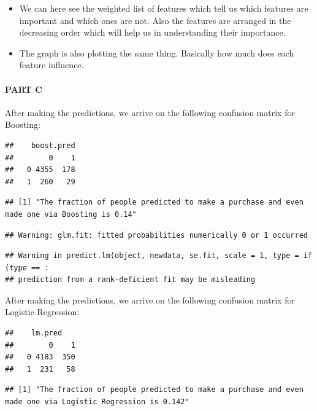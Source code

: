 \documentclass[
]{article}
\providecommand{\tightlist}{%
  \setlength{\itemsep}{0pt}\setlength{\parskip}{0pt}}
\begin{document}
\begin{itemize}
\tightlist
\item
  We can here see the weighted list of features which tell us which
  features are important and which ones are not. Also the features are
  arranged in the decreasing order which will help us in understanding
  their importance.
\item
  The graph is also plotting the same thing. Basically how much does
  each feature influence.
\end{itemize}

\hypertarget{part-c-5}{%
\paragraph{\texorpdfstring{{PART C}}{PART C}}\label{part-c-5}}

After making the predictions, we arrive on the following confusion
matrix for Boosting:

\begin{verbatim}
##    boost.pred
##        0    1
##   0 4355  178
##   1  260   29
\end{verbatim}

\begin{verbatim}
## [1] "The fraction of people predicted to make a purchase and even made one via Boosting is 0.14"
\end{verbatim}

\begin{verbatim}
## Warning: glm.fit: fitted probabilities numerically 0 or 1 occurred
\end{verbatim}

\begin{verbatim}
## Warning in predict.lm(object, newdata, se.fit, scale = 1, type = if (type == :
## prediction from a rank-deficient fit may be misleading
\end{verbatim}

After making the predictions, we arrive on the following confusion
matrix for Logistic Regression:

\begin{verbatim}
##    lm.pred
##        0    1
##   0 4183  350
##   1  231   58
\end{verbatim}

\begin{verbatim}
## [1] "The fraction of people predicted to make a purchase and even made one via Logistic Regression is 0.142"
\end{verbatim}
\end{document}
